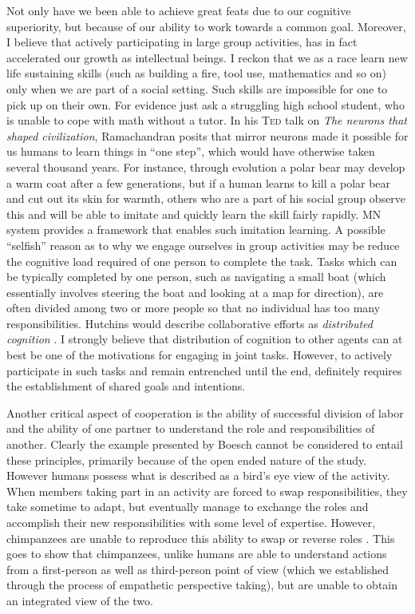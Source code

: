 \documentclass[12pt, letter]{article}
\begin{document}
Not only have we been able to achieve great feats due to our cognitive superiority, but because of our ability to work towards a common goal. Moreover, I believe that actively participating in large group activities, has in fact accelerated our growth as intellectual beings. I reckon that we as a race learn new life sustaining skills (such as building a fire, tool use, mathematics and so on) only when we are part of a social setting. Such skills are impossible for one to pick up on their own. For evidence just ask a struggling high school student, who is unable to cope with math without a tutor. In his \textsc{Ted} talk on \emph{The neurons that shaped civilization}, Ramachandran posits that mirror neurons made it possible for us humans to learn things in ``one step'', which would have otherwise taken several thousand years. For instance, through evolution a polar bear may develop a warm coat after a few generations, but if a human learns to kill a polar bear and cut out its skin for warmth, others who are a part of his social group observe this and will be able to imitate and quickly learn the skill fairly rapidly. MN system provides a framework that enables such imitation learning. A possible ``selfish'' reason as to why we engage ourselves in group activities may be reduce the cognitive load required of one person to complete the task. Tasks which can be typically completed by one person, such as navigating a small boat (which essentially involves steering the boat and looking at a map for direction), are often divided among two or more people so that no individual has too many responsibilities. Hutchins would describe collaborative efforts as \emph{distributed cognition} \cite{hutchins1995cognition}. I strongly believe that distribution of cognition to other agents can at best be one of the motivations for engaging in joint tasks. However, to actively participate in such tasks and remain entrenched until the end, definitely requires the establishment of shared goals and intentions.

Another critical aspect of cooperation is the ability of successful division of labor and the ability of one partner to understand the role and responsibilities of another. Clearly the example presented by Boesch cannot be considered to entail these principles, primarily because of the open ended nature of the study. However humans possess what is described as a bird's eye view \cite{nagel1979possibility} of the activity. When members taking part in an activity are forced to swap responsibilities, they take sometime to adapt, but eventually manage to exchange the roles and accomplish their new responsibilities with some level of expertise. However, chimpanzees are unable to reproduce this ability to swap or reverse roles \cite{carpenter2005role}. This goes to show that chimpanzees, unlike humans are able to understand actions from a first-person as well as third-person point of view (which we established through the process of empathetic perspective taking), but are unable to obtain an integrated view of the two.
\end{document}
